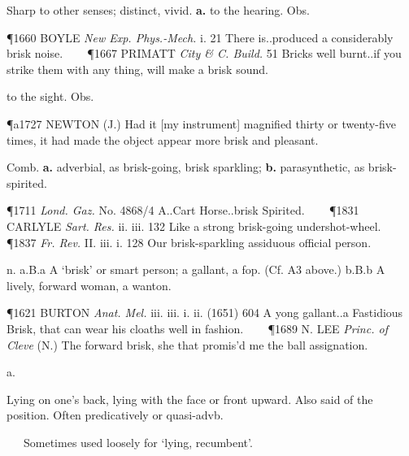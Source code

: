 \begin{description}[wide, labelwidth=!, labelindent=0pt]
\begin{myenumerate}
 Sharp to other senses; distinct, vivid. \textbf{a.} to the hearing. Obs.

\P 1660 BOYLE  \textit{New Exp. Phys.-Mech.} i. 21 There is..produced a considerably brisk noise.    
\P 1667 PRIMATT  \textit{City \& C. Build.} 51 Bricks well burnt..if you strike them with any thing, will make a brisk sound.

 to the sight. Obs.

\P a1727 NEWTON  (J.) Had it [my instrument] magnified thirty or twenty-five times, it had made the object appear more brisk and pleasant.

 Comb. \textbf{a.} adverbial, as brisk-going, brisk sparkling; \textbf{b.} parasynthetic, as brisk-spirited.

\P 1711  \textit{Lond. Gaz.} No. 4868/4 A..Cart Horse..brisk Spirited.    
\P 1831 CARLYLE  \textit{Sart. Res.} ii. iii. 132 Like a strong brisk-going undershot-wheel.    
\P 1837   \textit{Fr. Rev.} II. iii. i. 128 Our brisk-sparkling assiduous official person.

 n. a.B.a A ‘brisk’ or smart person; a gallant, a fop. (Cf. A3 above.) b.B.b A lively, forward woman, a wanton.

\P 1621 BURTON  \textit{Anat. Mel.} iii. iii. i. ii. (1651) 604 A yong gallant..a Fastidious Brisk, that can wear his cloaths well in fashion.    
\P 1689 N. LEE  \textit{Princ. of Cleve} (N.) The forward brisk, she that promis'd me the ball assignation.
\end{myenumerate}


 a.

\noindent {}

\vspace{-0.3cm}

\begin{myenumerate}

 Lying on one's back, lying with the face or front upward. Also said of the position. Often predicatively or quasi-advb.

   Sometimes used loosely for ‘lying, recumbent’.


\end{myenumerate}
\end{description}
